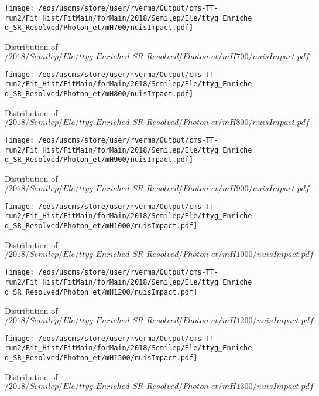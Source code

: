 \begin{figure}
\centering
\texttt{[image: /eos/uscms/store/user/rverma/Output/cms-TT-run2/Fit\_Hist/FitMain/forMain/2018/Semilep/Ele/ttyg\_Enriched\_SR\_Resolved/Photon\_et/mH700/nuisImpact.pdf]}
\caption{Distribution of $/2018/Semilep/Ele/ttyg\_Enriched\_SR\_Resolved/Photon\_et/mH700/nuisImpact.pdf$}
\end{figure}

\begin{figure}
\centering
\texttt{[image: /eos/uscms/store/user/rverma/Output/cms-TT-run2/Fit\_Hist/FitMain/forMain/2018/Semilep/Ele/ttyg\_Enriched\_SR\_Resolved/Photon\_et/mH800/nuisImpact.pdf]}
\caption{Distribution of $/2018/Semilep/Ele/ttyg\_Enriched\_SR\_Resolved/Photon\_et/mH800/nuisImpact.pdf$}
\end{figure}

\begin{figure}
\centering
\texttt{[image: /eos/uscms/store/user/rverma/Output/cms-TT-run2/Fit\_Hist/FitMain/forMain/2018/Semilep/Ele/ttyg\_Enriched\_SR\_Resolved/Photon\_et/mH900/nuisImpact.pdf]}
\caption{Distribution of $/2018/Semilep/Ele/ttyg\_Enriched\_SR\_Resolved/Photon\_et/mH900/nuisImpact.pdf$}
\end{figure}

\begin{figure}
\centering
\texttt{[image: /eos/uscms/store/user/rverma/Output/cms-TT-run2/Fit\_Hist/FitMain/forMain/2018/Semilep/Ele/ttyg\_Enriched\_SR\_Resolved/Photon\_et/mH1000/nuisImpact.pdf]}
\caption{Distribution of $/2018/Semilep/Ele/ttyg\_Enriched\_SR\_Resolved/Photon\_et/mH1000/nuisImpact.pdf$}
\end{figure}

\begin{figure}
\centering
\texttt{[image: /eos/uscms/store/user/rverma/Output/cms-TT-run2/Fit\_Hist/FitMain/forMain/2018/Semilep/Ele/ttyg\_Enriched\_SR\_Resolved/Photon\_et/mH1200/nuisImpact.pdf]}
\caption{Distribution of $/2018/Semilep/Ele/ttyg\_Enriched\_SR\_Resolved/Photon\_et/mH1200/nuisImpact.pdf$}
\end{figure}

\begin{figure}
\centering
\texttt{[image: /eos/uscms/store/user/rverma/Output/cms-TT-run2/Fit\_Hist/FitMain/forMain/2018/Semilep/Ele/ttyg\_Enriched\_SR\_Resolved/Photon\_et/mH1300/nuisImpact.pdf]}
\caption{Distribution of $/2018/Semilep/Ele/ttyg\_Enriched\_SR\_Resolved/Photon\_et/mH1300/nuisImpact.pdf$}
\end{figure}

